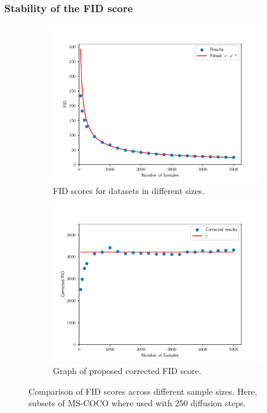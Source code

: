 \documentclass[11pt]{article}
\begin{document}
\subsubsection{Stability of the FID score}
\begin{figure}
    \centering
    \begin{subfigure}{0.4\textwidth}
        \includegraphics[width=\textwidth]{assets/num_samples_comparison.pdf}
        \caption{FID scores for datasets in different sizes.}
        \label{fig:num_samples_comparison}
    \end{subfigure}
    \hfill
    \begin{subfigure}{0.4\textwidth}
        \includegraphics[width=\textwidth]{assets/num_samples_comparison_corrected.pdf}
        \caption{Graph of proposed corrected FID score.}
        \label{fig:num_samples_comparison_corrected}
    \end{subfigure}
    \caption{Comparison of FID scores across different sample sizes. Here, subsets of MS-COCO where used with 250 diffusion steps.}
\end{figure}
\end{document}
